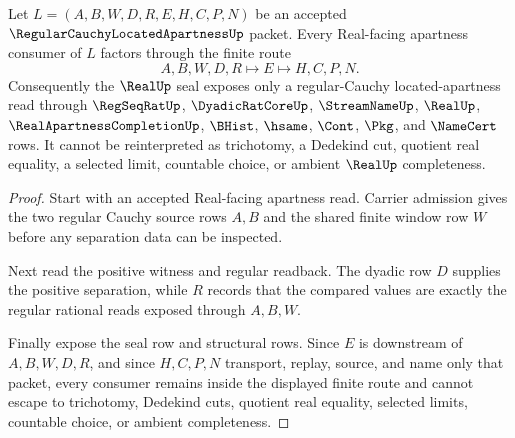 \begin{theorem}
\label{thm:regular-cauchy-located-apartness-real-seal-boundary}
Let $L=(A,B,W,D,R,E,H,C,P,N)$ be an accepted $\RegularCauchyLocatedApartnessUp$ packet. Every Real-facing apartness consumer of $L$ factors through the finite route
$$
A,B,W,D,R \longmapsto E \longmapsto H,C,P,N .
$$
Consequently the $\RealUp$ seal exposes only a regular-Cauchy located-apartness read through $\RegSeqRatUp$, $\DyadicRatCoreUp$, $\StreamNameUp$, $\RealUp$, $\RealApartnessCompletionUp$, $\BHist$, $\hsame$, $\Cont$, $\Pkg$, and $\NameCert$ rows. It cannot be reinterpreted as trichotomy, a Dedekind cut, quotient real equality, a selected limit, countable choice, or ambient $\RealUp$ completeness.
\end{theorem}
\begin{proof}
Start with an accepted Real-facing apartness read. Carrier admission gives the two regular Cauchy source rows $A,B$ and the shared finite window row $W$ before any separation data can be inspected.

Next read the positive witness and regular readback. The dyadic row $D$ supplies the positive separation, while $R$ records that the compared values are exactly the regular rational reads exposed through $A,B,W$.

Finally expose the seal row and structural rows. Since $E$ is downstream of $A,B,W,D,R$, and since $H,C,P,N$ transport, replay, source, and name only that packet, every consumer remains inside the displayed finite route and cannot escape to trichotomy, Dedekind cuts, quotient real equality, selected limits, countable choice, or ambient completeness.
\end{proof}



